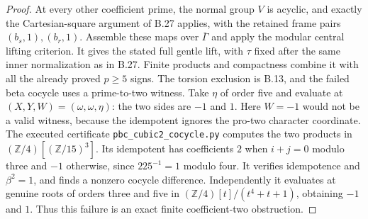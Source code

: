 \begin{proof}
At every other coefficient prime, the normal group
$V$ is acyclic, and exactly the Cartesian-square
argument of B.27 applies, with the retained frame
pairs $(b_s,1),(b_r,1)$. Assemble these maps over
$\overline\Gamma$ and apply the modular central
lifting criterion. It gives the stated full gentle
lift, with $\tau$ fixed after the same inner
normalization as in B.27. Finite products and
compactness combine it with all the already proved
$p\geq5$ signs. The torsion exclusion is B.13,
and the failed beta cocycle uses a prime-to-two
witness. Take $\eta$ of order five and evaluate at
$(X,Y,W)=(\omega,\omega,\eta)$: the two sides are
$-1$ and $1$. Here $W=-1$ would not be a valid witness,
because the idempotent ignores the pro-two character
coordinate. The executed certificate
\texttt{pbc\_cubic2\_cocycle.py} computes the two
products in $(\mathbb Z/4)[(\mathbb Z/15)^3]$. Its
idempotent has coefficients $2$ when $i+j=0$ modulo
three and $-1$ otherwise, since $225^{-1}=1$ modulo
four. It verifies idempotence and $\beta^2=1$, and
finds a nonzero cocycle difference. Independently it
evaluates at genuine roots of orders three and five
in $(\mathbb Z/4)[t]/(t^4+t+1)$, obtaining $-1$ and
$1$. Thus this failure is an exact finite coefficient-two
obstruction.
\end{proof}

